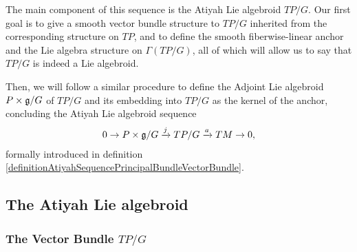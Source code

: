The main component of this sequence is the Atiyah Lie algebroid $TP/G$. Our first goal is to give a smooth vector bundle structure to $TP/G$ inherited from the corresponding structure on $TP$, and to define the smooth fiberwise-linear anchor and the Lie algebra structure on $\Gamma(TP/G)$, all of which will allow us to say that $TP/G$ is indeed a Lie algebroid.

Then, we will follow a similar procedure to define the Adjoint Lie algebroid $P \times \mathfrak{g}/G$ of $TP/G$ and its embedding into $TP/G$ as the kernel of the anchor, concluding the Atiyah Lie algebroid sequence
\begin{align*}
    0 \to P \times \mathfrak{g}/G \xrightarrow{j} TP/G \xrightarrow{a} TM \to 0,
\end{align*}
formally introduced in definition \ref{definitionAtiyahSequencePrincipalBundleVectorBundle}.

\subsection{The Atiyah Lie algebroid}

\subsubsection{The Vector Bundle $TP/G$}


